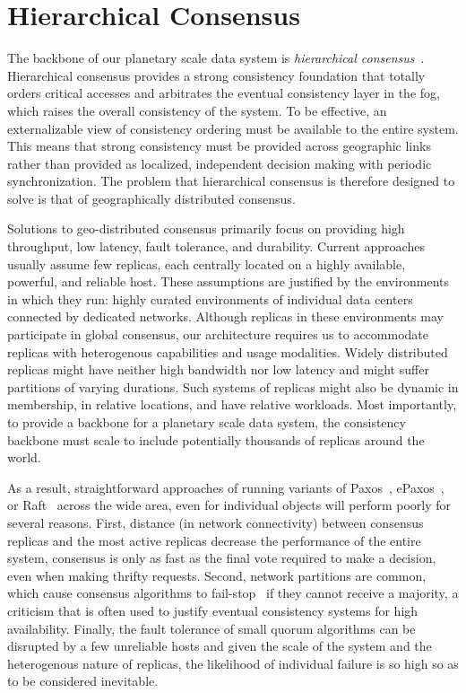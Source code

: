 
\renewcommand{\thechapter}{3}

\chapter{Hierarchical Consensus}
\label{ch:hierarchical_consensus}

The backbone of our planetary scale data system is \emph{hierarchical consensus}~\cite{hc_brief_announcement}.
Hierarchical consensus provides a strong consistency foundation that totally orders critical accesses and arbitrates the eventual consistency layer in the fog, which raises the overall consistency of the system.
To be effective, an externalizable view of consistency ordering must be available to the entire system.
This means that strong consistency must be provided across geographic links rather than provided as localized, independent decision making with periodic synchronization.
The problem that hierarchical consensus is therefore designed to solve is that of geographically distributed consensus.

Solutions to geo-distributed consensus primarily focus on providing high throughput, low latency, fault tolerance, and durability.
Current approaches \cite{epaxos,mencius,calvindb,spaxos,sutra_fast_2011,peluso_making_2016} usually assume few replicas, each centrally located on a highly available, powerful, and reliable host.
These assumptions are justified by the environments in which they run: highly curated environments of individual data centers connected by dedicated networks.
Although replicas in these environments may participate in global consensus, our architecture requires us to accommodate replicas with heterogenous capabilities and usage modalities.
Widely distributed replicas might have neither high bandwidth nor low latency and might suffer partitions of varying durations.
Such systems of replicas might also be dynamic in membership, in relative locations, and have relative workloads.
Most importantly, to provide a backbone for a planetary scale data system, the consistency backbone must scale to include potentially thousands of replicas around the world.

As a result, straightforward approaches of running variants of Paxos~\cite{paxos,paxos_simple}, ePaxos~\cite{epaxos}, or Raft~\cite{raft} across the wide area, even for individual objects will perform poorly for several reasons.
First, distance (in network connectivity) between consensus replicas and the most active replicas decrease the performance of the entire system, consensus is only as fast as the final vote required to make a decision, even when making thrifty requests.
Second, network partitions are common, which cause consensus algorithms to fail-stop~\cite{fail-stop} if they cannot receive a majority, a criticism that is often used to justify eventual consistency systems for high availability.
Finally, the fault tolerance of small quorum algorithms can be disrupted by a few unreliable hosts and given the scale of the system and the heterogenous nature of replicas, the likelihood of individual failure is so high so as to be considered inevitable.

